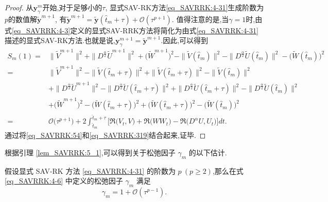 \begin{proof}
从$\bm{y}_\gamma^m$开始,对于足够小的$\tau$, 显式SAV-RK方法\eqref{eq_SAVRRK:4-31}生成阶数为$p$的数值解$\tilde{\bm{y}}^{m+1}$,
有$\tilde{\bm{y}}^{m+1}=\tilde{\bm{y}}\left(\hat{t}_m+\tau\right)+\mathcal{O}\left(\tau^{p+1}\right)$.
值得注意的是,当$\gamma=1$时,由式\eqref{eq_SAVRRK:4-3}定义的显式SAV-RRK方法将简化为由式\eqref{eq_SAVRRK:4-31}描述的显式SAV-RK方法.也就是说,$\bm{y}_\gamma^{m +1}=\tilde{\bm{y}}^{m +1}$.因此,可以得到
\begin{align}
S_m(1) = &\|\tilde{V}^{m+1}\|^2 + \|D^\frac{\alpha}{2} \tilde{U}^{m+1}\|^2+\big(\tilde{W}^{m+1}\big)^2-\|\tilde{V}(\hat{t}_{m})\|^2 - \|D^\frac{\alpha}{2} \tilde{U}(\hat{t}_{m})\|^2-\big(\tilde{W}(\hat{t}_{m})\big)^2 \nonumber\\
= &\|\tilde{V}^{m+1}\|^2 -\|\tilde{V}(\hat{t}_{m}+\tau)\|^2 +\|\tilde{V}(\hat{t}_{m}+\tau)\|^2-\|\tilde{V}(\hat{t}_{m})\|^2\nonumber\\
& + \|D^\frac{\alpha}{2} \tilde{U}^{m+1}\|^2 -\|D^\frac{\alpha}{2} \tilde{U}(\hat{t}_{m}+\tau)\|^2+\|D^\frac{\alpha}{2} \tilde{U}(\hat{t}_{m}+\tau)\|^2- \|D^\frac{\alpha}{2} \tilde{U}(\hat{t}_{m})\|^2\nonumber\\
& +\big(\tilde{W}^{m+1}\big)^2 -\big(\tilde{W}(\hat{t}_{m}+\tau)\big)^2+\big(\tilde{W}(\hat{t}_{m}+\tau)\big)^2-\big(\tilde{W}(\hat{t}_{m})\big)^2 \nonumber\\
= &\mathcal{O}\big(\tau^{p+1}\big) +2\int_{\hat{t}_m}^{\hat{t}_m+\tau}\big[\Re\big(V_t, V\big) + \Re\big(W W_t\big) - \Re\big(D^{\alpha} U, U_t\big)\big]dt.\label{eq_SAVRRK:54}
\end{align}
通过将\eqref{eq_SAVRRK:54}和\eqref{eq_SAVRRK:319}结合起来,证毕.
\end{proof}

根据引理 \ref{lem_SAVRRK:5_1},可以得到关于松弛因子 $\gamma_m$ 的以下估计.

\begin{theorem}\label{thm_SAVRRK:5_1}
假设显式 SAV-RK 方法 \eqref{eq_SAVRRK:4-31} 的阶数为 $p~(p \geq 2)$,那么在式 \eqref{eq_SAVRRK:4-6} 中定义的松弛因子 $\gamma_m$ 满足
\begin{equation}\label{eq_SAVRRK:5_3}
\gamma_m=1+\mathcal{O}(\tau^{p-1}).
\end{equation}
\end{theorem}	

